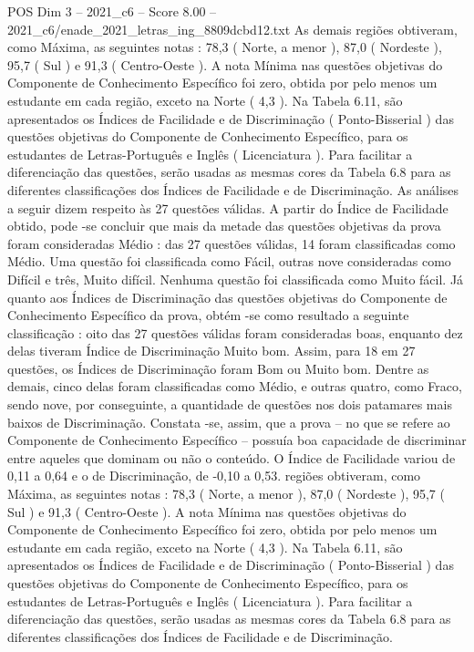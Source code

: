 \begin{textsample}{POS Dim 3 – 2021\_c6 – Score 8.00 – 2021\_c6/enade\_2021\_letras\_ing\_8809dcbd12.txt}
As demais regiões obtiveram, como Máxima, as seguintes notas : 78,3 ( Norte, a menor ), 87,0 ( Nordeste ), 95,7 ( Sul ) e 91,3 ( Centro-Oeste ).
A nota Mínima nas questões objetivas do Componente de Conhecimento Específico foi zero, obtida por pelo menos um estudante em cada região, exceto na Norte ( 4,3 ).
Na Tabela 6.11, são apresentados os Índices de Facilidade e de Discriminação ( Ponto-Bisserial ) das questões objetivas do Componente de Conhecimento Específico, para os estudantes de Letras-Português e Inglês ( Licenciatura ).
Para facilitar a diferenciação das questões, serão usadas as mesmas cores da Tabela 6.8 para as diferentes classificações dos Índices de Facilidade e de Discriminação.
As análises a seguir dizem respeito às 27 questões válidas.
A partir do Índice de Facilidade obtido, pode -se concluir que mais da metade das questões objetivas da prova foram consideradas Médio : das 27 questões válidas, 14 foram classificadas como Médio.
Uma questão foi classificada como Fácil, outras nove consideradas como Difícil e três, Muito difícil.
Nenhuma questão foi classificada como Muito fácil.
Já quanto aos Índices de Discriminação das questões objetivas do Componente de Conhecimento Específico da prova, obtém -se como resultado a seguinte classificação : oito das 27 questões válidas foram consideradas boas, enquanto dez delas tiveram Índice de Discriminação Muito bom.
Assim, para 18 em 27 questões, os Índices de Discriminação foram Bom ou Muito bom.
Dentre as demais, cinco delas foram classificadas como Médio, e outras quatro, como Fraco, sendo nove, por conseguinte, a quantidade de questões nos dois patamares mais baixos de Discriminação.
Constata -se, assim, que a prova – no que se refere ao Componente de Conhecimento Específico – possuía boa capacidade de discriminar entre aqueles que dominam ou não o conteúdo.
O Índice de Facilidade variou de 0,11 a 0,64 e o de Discriminação, de -0,10 a 0,53. regiões obtiveram, como Máxima, as seguintes notas : 78,3 ( Norte, a menor ), 87,0 ( Nordeste ), 95,7 ( Sul ) e 91,3 ( Centro-Oeste ).
A nota Mínima nas questões objetivas do Componente de Conhecimento Específico foi zero, obtida por pelo menos um estudante em cada região, exceto na Norte ( 4,3 ).
Na Tabela 6.11, são apresentados os Índices de Facilidade e de Discriminação ( Ponto-Bisserial ) das questões objetivas do Componente de Conhecimento Específico, para os estudantes de Letras-Português e Inglês ( Licenciatura ).
Para facilitar a diferenciação das questões, serão usadas as mesmas cores da Tabela 6.8 para as diferentes classificações dos Índices de Facilidade e de Discriminação.

\end{textsample}
